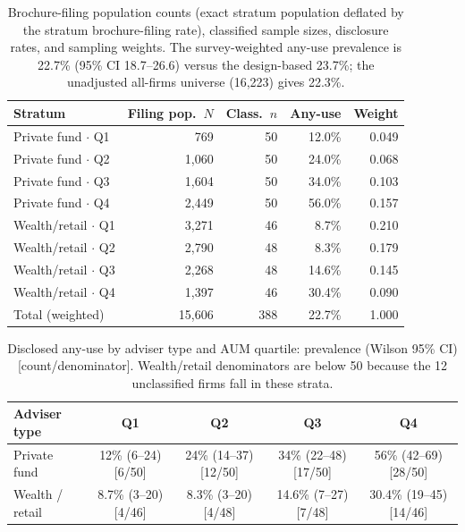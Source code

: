 \documentclass[utf8]{FrontiersinHarvard}
\begin{document}
\begin{table}[h!]
\caption{Brochure-filing population counts (exact stratum population deflated by the stratum brochure-filing rate), classified sample sizes, disclosure rates, and sampling weights. The survey-weighted any-use prevalence is 22.7\% (95\% CI 18.7--26.6) versus the design-based 23.7\%; the unadjusted all-firms universe (16{,}223) gives 22.3\%.}
\label{tab:weighting}
\centering
\begin{tabular}{lrrrr}
\toprule
Stratum & Filing pop.\ $N$ & Class.\ $n$ & Any-use & Weight \\
\midrule
Private fund $\cdot$ Q1 & 769 & 50 & 12.0\% & 0.049 \\
Private fund $\cdot$ Q2 & 1{,}060 & 50 & 24.0\% & 0.068 \\
Private fund $\cdot$ Q3 & 1{,}604 & 50 & 34.0\% & 0.103 \\
Private fund $\cdot$ Q4 & 2{,}449 & 50 & 56.0\% & 0.157 \\
Wealth/retail $\cdot$ Q1 & 3{,}271 & 46 & 8.7\% & 0.210 \\
Wealth/retail $\cdot$ Q2 & 2{,}790 & 48 & 8.3\% & 0.179 \\
Wealth/retail $\cdot$ Q3 & 2{,}268 & 48 & 14.6\% & 0.145 \\
Wealth/retail $\cdot$ Q4 & 1{,}397 & 46 & 30.4\% & 0.090 \\
Total (weighted) & 15{,}606 & 388 & 22.7\% & 1.000 \\
\bottomrule
\end{tabular}
\end{table}

\begin{table}[h!]
\caption{Disclosed any-use by adviser type and AUM quartile: prevalence (Wilson 95\% CI) [count/denominator]. Wealth/retail denominators are below 50 because the 12 unclassified firms fall in these strata.}
\label{tab:gradient}
\centering
\small
\begin{tabular}{lcccc}
\toprule
Adviser type & Q1 & Q2 & Q3 & Q4 \\
\midrule
Private fund & 12\% (6--24) [6/50] & 24\% (14--37) [12/50] & 34\% (22--48) [17/50] & 56\% (42--69) [28/50] \\
Wealth / retail & 8.7\% (3--20) [4/46] & 8.3\% (3--20) [4/48] & 14.6\% (7--27) [7/48] & 30.4\% (19--45) [14/46] \\
\bottomrule
\end{tabular}
\end{table}
\end{document}
